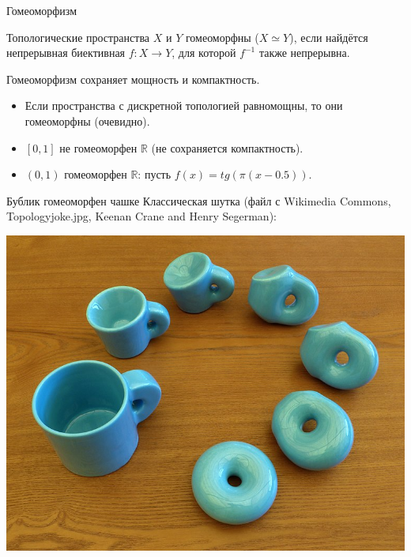 \documentclass[aspectratio=169,dvipsnames,usenames]{beamer}
\begin{document}
\begin{frame}{Гомеоморфизм}
\begin{dfn}
Топологические пространства $X$ и $Y$ гомеоморфны ($X \simeq Y$), если найдётся непрерывная биективная $f : X \rightarrow Y$, для которой $f^{-1}$ также непрерывна.
\end{dfn}

\begin{thm}
Гомеоморфизм сохраняет мощность и компактность.
\end{thm}

\begin{exm}
\begin{itemize}
\item Если пространства с дискретной топологией равномощны, то они гомеоморфны (очевидно).
\item $[0,1]$ не гомеоморфен $\mathbb{R}$ (не сохраняется компактность).
\item $(0,1)$ гомеоморфен $\mathbb{R}$: пусть $f(x) = tg(\pi (x - 0.5))$.
\end{itemize}
\end{exm}

\end{frame}

\begin{frame}{Бублик гомеоморфен чашке}
Классическая шутка (файл с Wikimedia Commons, Topology\textunderscore{}joke.jpg, Keenan Crane and Henry Segerman):

\begin{center}
    {\includegraphics[scale=0.2]{lection-07-homeomorphism.jpg}}
\end{center}

\end{frame}
\end{document}
